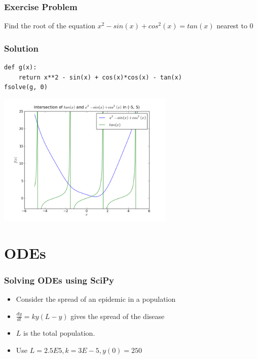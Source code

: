 \documentclass[14pt,compress]{beamer}
\newcounter{time}
\newcommand{\inctime}[1]{\addtocounter{time}{#1}{\tiny \thetime\ m}}
\begin{document}
\begin{frame}[fragile]
  \frametitle{Exercise Problem}
  Find the root of the equation $x^2 - sin(x) + cos^2(x) = tan(x)$ nearest to $0$
\end{frame}

\begin{frame}[fragile]
  \frametitle{Solution}
  \begin{small}
  \begin{lstlisting}
def g(x):
    return x**2 - sin(x) + cos(x)*cos(x) - tan(x)
fsolve(g, 0)
  \end{lstlisting}
  \end{small}
  \vspace*{-0.2in}
  \begin{center}
\includegraphics[height=2.5in, interpolate=true]{data/fsolve_tanx}
\end{center}
\vspace*{-0.5in}
  \inctime{5}
\end{frame}




\section{ODEs}

\begin{frame}
\frametitle{Solving ODEs using SciPy}
\begin{itemize}
\item Consider the spread of an epidemic in a population
  \vspace*{0.1in}
\item $\frac{dy}{dt} = ky(L-y)$ gives the spread of the disease
  \vspace*{0.1in}
\item $L$ is the total population.
\item Use $L = 2.5E5, k = 3E-5, y(0) = 250$
\end{itemize}
\end{frame}
\end{document}

